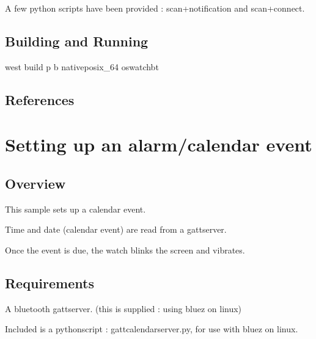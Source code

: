 \documentclass[letterpaper,10pt,english]{sphinxmanual}
\begin{document}
A few python scripts have been provided : scan+notification and scan+connect.


\subsection{Building and Running}
\label{\detokenize{samples/apposwatch-btREADME:building-and-running}}
west build \sphinxhyphen{}p \sphinxhyphen{}b  native\sphinxhyphen{}posix\_64 oswatch\sphinxhyphen{}bt


\subsection{References}
\label{\detokenize{samples/apposwatch-btREADME:references}}

\section{Setting up an alarm/calendar event}
\label{\detokenize{samples/apposwatch-calendarREADME:setting-up-an-alarm-calendar-event}}\label{\detokenize{samples/apposwatch-calendarREADME:oswatch}}\label{\detokenize{samples/apposwatch-calendarREADME::doc}}

\subsection{Overview}
\label{\detokenize{samples/apposwatch-calendarREADME:overview}}
This sample sets up a calendar event.

Time and date (calendar event) are read from a gatt\sphinxhyphen{}server.

Once the event is due, the watch blinks the screen and vibrates.


\subsection{Requirements}
\label{\detokenize{samples/apposwatch-calendarREADME:requirements}}
A bluetooth gatt\sphinxhyphen{}server. (this is supplied : using bluez on linux)

Included is a python\sphinxhyphen{}script : gatt\sphinxhyphen{}calendar\sphinxhyphen{}server.py, for use with bluez on linux.

\begin{sphinxVerbatim}[commandchars=\\\{\}]
 
\end{sphinxVerbatim}
\end{document}
